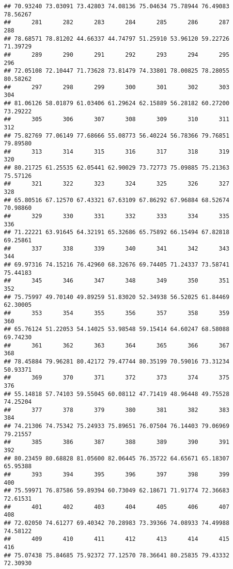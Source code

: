 \documentclass[
]{article}
\begin{document}
\begin{verbatim}
## 70.93240 73.03091 73.42803 74.08136 75.04634 75.78944 76.49083 78.56267 
##      281      282      283      284      285      286      287      288 
## 78.68571 78.81202 44.66337 44.74797 51.25910 53.96120 59.22726 71.39729 
##      289      290      291      292      293      294      295      296 
## 72.05108 72.10447 71.73628 73.81479 74.33801 78.00825 78.28055 80.58262 
##      297      298      299      300      301      302      303      304 
## 81.06126 58.01879 61.03406 61.29624 62.15889 56.28182 60.27200 73.29222 
##      305      306      307      308      309      310      311      312 
## 75.82769 77.06149 77.68666 55.08773 56.40224 56.78366 79.76851 79.89580 
##      313      314      315      316      317      318      319      320 
## 80.21725 61.25535 62.05441 62.90029 73.72773 75.09885 75.21363 75.57126 
##      321      322      323      324      325      326      327      328 
## 65.80516 67.12570 67.43321 67.63109 67.86292 67.96884 68.52674 70.98860 
##      329      330      331      332      333      334      335      336 
## 71.22221 63.91645 64.32191 65.32686 65.75892 66.15494 67.82818 69.25861 
##      337      338      339      340      341      342      343      344 
## 69.97316 74.15216 76.42960 68.32676 69.74405 71.24337 73.58741 75.44183 
##      345      346      347      348      349      350      351      352 
## 75.75997 49.70140 49.89259 51.83020 52.34938 56.52025 61.84469 62.30005 
##      353      354      355      356      357      358      359      360 
## 65.76124 51.22053 54.14025 53.98548 59.15414 64.60247 68.58088 69.74230 
##      361      362      363      364      365      366      367      368 
## 78.45884 79.96281 80.42172 79.47744 80.35199 70.59016 73.31234 50.93371 
##      369      370      371      372      373      374      375      376 
## 55.14818 57.74103 59.55045 60.08112 47.71419 48.96448 49.75528 74.25204 
##      377      378      379      380      381      382      383      384 
## 74.21306 74.75342 75.24933 75.89651 76.07504 76.14403 79.06969 79.21557 
##      385      386      387      388      389      390      391      392 
## 80.23459 80.68828 81.05600 82.06445 76.35722 64.65671 65.18307 65.95388 
##      393      394      395      396      397      398      399      400 
## 75.59971 76.87586 59.89394 60.73049 62.18671 71.91774 72.36683 72.61531 
##      401      402      403      404      405      406      407      408 
## 72.02050 74.61277 69.40342 70.28983 73.39366 74.08933 74.49988 74.58122 
##      409      410      411      412      413      414      415      416 
## 75.07438 75.84685 75.92372 77.12570 78.36641 80.25835 79.43332 72.30930 

\end{verbatim}
\end{document}

